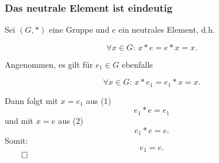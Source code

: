 %
\begin{frame}\frametitle{Das neutrale Element ist eindeutig}
	
	Sei $(G,\ast)$ eine Gruppe und $e$ ein neutrales Element, d.h.
	
	\begin{equation}\label{l_neutralesElement_1}
		\forall x\in G:\, x\ast e = e\ast x = x.
	\end{equation}
	
	\pause
	Angenommen, es gilt für $e_1\in G$ ebenfalls
	
	\begin{equation}\label{l_neutralesElement_2}
		\forall x\in G:\, x\ast e_1 = e_1\ast x = x.
	\end{equation}
	
	\pause
	Dann folgt mit $x=e_1$ aus (1)
	$$
		e_1\ast e = e_1
	$$\pause
	und mit $x=e$ aus (2)
	$$
		e_1\ast e = e.
	$$\pause
	Somit:
	$$
		e_1 = e.
	$$
	\hfill$\qed$
		
\end{frame}
%
